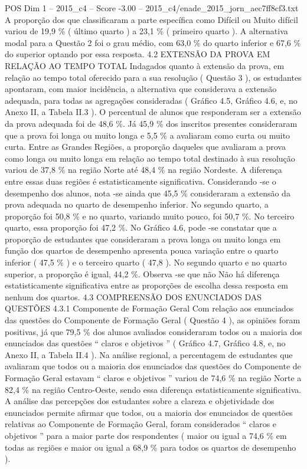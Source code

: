 \begin{textsample}{POS Dim 1 – 2015\_c4 – Score -3.00 – 2015\_c4/enade\_2015\_jorn\_aec7ff8cf3.txt}
A proporção dos que classificaram a parte específica como Difícil ou Muito difícil variou de 19,9 \% ( último quarto ) a 23,1 \% ( primeiro quarto ).
A alternativa modal para a Questão 2 foi o grau médio, com 63,0 \% do quarto inferior e 67,6 \% do superior optando por essa resposta. 4.2 EXTENSÃO DA PROVA EM RELAÇÃO AO TEMPO TOTAL Indagados quanto à extensão da prova, em relação ao tempo total oferecido para a sua resolução ( Questão 3 ), os estudantes apontaram, com maior incidência, a alternativa que considerava a extensão adequada, para todas as agregações consideradas ( Gráfico 4.5, Gráfico 4.6, e, no Anexo II, a Tabela II.3 ).
O percentual de alunos que responderam ser a extensão da prova adequada foi de 48,6 \%.
Já 45,9 \% dos inscritos presentes consideraram que a prova foi longa ou muito longa e 5,5 \% a avaliaram como curta ou muito curta.
Entre as Grandes Regiões, a proporção daqueles que avaliaram a prova como longa ou muito longa em relação ao tempo total destinado à sua resolução variou de 37,8 \% na região Norte até 48,4 \% na região Nordeste.
A diferença entre essas duas regiões é estatisticamente significativa.
Considerando -se o desempenho dos alunos, nota -se ainda que 45,5 \% consideraram a extensão da prova adequada no quarto de desempenho inferior.
No segundo quarto, a proporção foi 50,8 \% e no quarto, variando muito pouco, foi 50,7 \%.
No terceiro quarto, essa proporção foi 47,2 \%.
No Gráfico 4.6, pode -se constatar que a proporção de estudantes que consideraram a prova longa ou muito longa em função dos quartos de desempenho apresenta pouca variação entre o quarto inferior ( 47,5 \% ) e o terceiro quarto ( 47,8 ).
No segundo quarto e no quarto superior, a proporção é igual, 44,2 \%.
Observa -se que não Não há diferença estatisticamente significativa entre as proporções de escolha dessa resposta em nenhum dos quartos. 4.3 COMPREENSÃO DOS ENUNCIADOS DAS QUESTÕES 4.3.1 Componente de Formação Geral Com relação aos enunciados das questões do Componente de Formação Geral ( Questão 4 ), as opiniões foram positivas, já que 79,5 \% dos alunos avaliados consideraram todos ou a maioria dos enunciados das questões “ claros e objetivos ” ( Gráfico 4.7, Gráfico 4.8, e, no Anexo II, a Tabela II.4 ).
Na análise regional, a percentagem de estudantes que avaliaram que todos ou a maioria dos enunciados das questões do Componente de Formação Geral estavam “ claros e objetivos ” variou de 74,6 \% na região Norte a 82,4 \% na região Centro-Oeste, sendo essa diferença estatisticamente significativa.
A análise das percepções dos estudantes sobre a clareza e objetividade dos enunciados permite afirmar que todos, ou a maioria dos enunciados de questões relativas ao Componente de Formação Geral, foram considerados “ claros e objetivos ” para a maior parte dos respondentes ( maior ou igual a 74,6 \% em todas as regiões e maior ou igual a 68,9 \% para todos os quartos de desempenho ).

\end{textsample}

